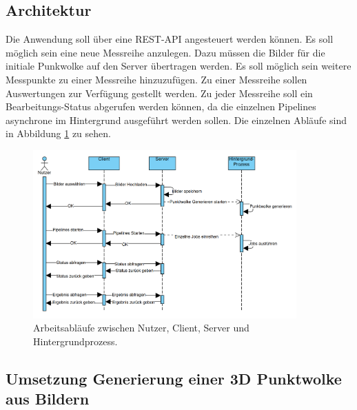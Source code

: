 \documentclass[12pt,titlepage, twoside]{article}
\begin{document}
\subsection{Architektur}
\label{sec:realisierung:architektur}

Die Anwendung soll über eine REST-API angesteuert werden können. Es soll möglich sein eine neue Messreihe anzulegen. Dazu müssen die Bilder für die initiale Punkwolke auf den Server übertragen werden. 
Es soll möglich sein weitere Messpunkte zu einer Messreihe hinzuzufügen. Zu einer Messreihe sollen Auswertungen zur Verfügung gestellt werden. 
Zu jeder Messreihe soll ein Bearbeitungs-Status abgerufen werden können, da die einzelnen Pipelines asynchrone im Hintergrund ausgeführt werden sollen.
Die einzelnen Abläufe sind in Abbildung \ref{fig:WorkflowClientServer} zu sehen.

\begin{figure}
    \centering
    \includegraphics[width=0.9\textwidth]{./Images/WorkflowClientServer.png}
    \caption{Arbeitsabläufe zwischen Nutzer, Client, Server und Hintergrundprozess.}
    \label{fig:WorkflowClientServer}
\end{figure}

\subsection{Umsetzung Generierung einer 3D Punktwolke aus Bildern}
\label{sec:realisierung:implementierung1}
\end{document}
